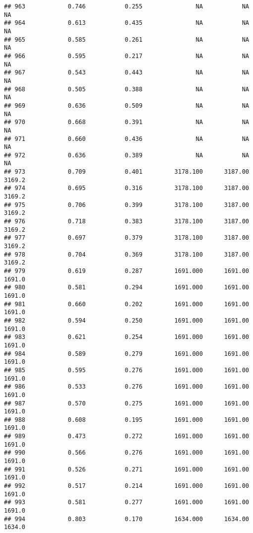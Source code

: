 \documentclass[
]{article}
\begin{document}
\begin{verbatim}
## 963            0.746           0.255               NA           NA           NA
## 964            0.613           0.435               NA           NA           NA
## 965            0.585           0.261               NA           NA           NA
## 966            0.595           0.217               NA           NA           NA
## 967            0.543           0.443               NA           NA           NA
## 968            0.505           0.388               NA           NA           NA
## 969            0.636           0.509               NA           NA           NA
## 970            0.668           0.391               NA           NA           NA
## 971            0.660           0.436               NA           NA           NA
## 972            0.636           0.389               NA           NA           NA
## 973            0.709           0.401         3178.100      3187.00       3169.2
## 974            0.695           0.316         3178.100      3187.00       3169.2
## 975            0.706           0.399         3178.100      3187.00       3169.2
## 976            0.718           0.383         3178.100      3187.00       3169.2
## 977            0.697           0.379         3178.100      3187.00       3169.2
## 978            0.704           0.369         3178.100      3187.00       3169.2
## 979            0.619           0.287         1691.000      1691.00       1691.0
## 980            0.581           0.294         1691.000      1691.00       1691.0
## 981            0.660           0.202         1691.000      1691.00       1691.0
## 982            0.594           0.250         1691.000      1691.00       1691.0
## 983            0.621           0.254         1691.000      1691.00       1691.0
## 984            0.589           0.279         1691.000      1691.00       1691.0
## 985            0.595           0.276         1691.000      1691.00       1691.0
## 986            0.533           0.276         1691.000      1691.00       1691.0
## 987            0.570           0.275         1691.000      1691.00       1691.0
## 988            0.608           0.195         1691.000      1691.00       1691.0
## 989            0.473           0.272         1691.000      1691.00       1691.0
## 990            0.566           0.276         1691.000      1691.00       1691.0
## 991            0.526           0.271         1691.000      1691.00       1691.0
## 992            0.517           0.214         1691.000      1691.00       1691.0
## 993            0.581           0.277         1691.000      1691.00       1691.0
## 994            0.803           0.170         1634.000      1634.00       1634.0

\end{verbatim}
\end{document}
